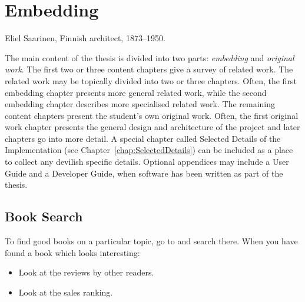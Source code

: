 %
%
% 
% 
% 

\chapter{Embedding}

\label{chap:Embedding}

{
Eliel Saarinen, Finnish architect, 1873--1950.
}




The main content of the thesis is divided into two parts:
\emph{embedding} and \emph{original work}.
%
The first two or three content chapters give a survey of related work.
The related work may be topically divided into two or three chapters.
Often, the first embedding chapter presents more general related work,
while the second embedding chapter describes more specialised related
work.
%
The remaining content chapters present the student's own original
work. Often, the first original work chapter presents the general
design and architecture of the project and later chapters go into more
detail. A special chapter called Selected Details of the
Implementation (see Chapter~\ref{chap:SelectedDetails}) can be
included as a place to collect any devilish specific details.
%
Optional appendices may include a User Guide and a Developer Guide,
when software has been written as part of the thesis.




\section{Book Search}

To find good books on a particular topic, go to 
and search there. When you have found a book which looks interesting:
\begin{itemize}
\item Look at the reviews by other readers.

\item Look at the sales ranking.
\end{itemize}




